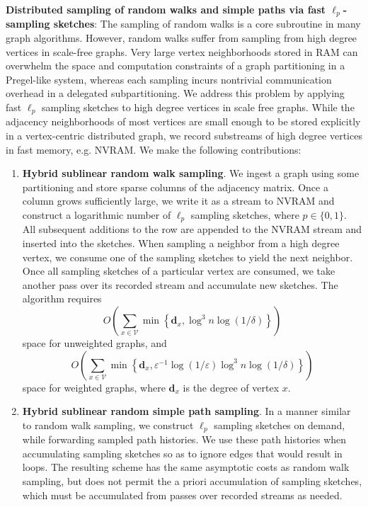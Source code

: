 \documentclass{report}
\begin{document}
\noindent
\textbf{Distributed sampling of random walks and simple paths via fast $\ell_p$-sampling sketches}:
The sampling of random walks is a core subroutine in many graph algorithms.
However, random walks suffer from sampling from high degree vertices in scale-free graphs. 
Very large vertex neighborhoods stored in RAM can overwhelm the space and computation constraints of a graph partitioning in a Pregel-like system, whereas each sampling incurs nontrivial communication overhead in a delegated subpartitioning. 
We address this problem by applying fast $\ell_p$ sampling sketches to high degree vertices in scale free graphs. 
While the adjacency neighborhoods of most vertices are small enough to be stored explicitly in a vertex-centric distributed graph, we record substreams of high degree vertices in fast memory, e.g. NVRAM. 
We make the following contributions:
%
\begin{enumerate}
	\item \textbf{Hybrid sublinear random walk sampling}. 
	We ingest a graph using some partitioning and store sparse columns of the adjacency matrix. 
	Once a column grows sufficiently large, we write it as a stream to NVRAM and construct a logarithmic number of $\ell_p$ sampling sketches, where $p \in \{0,1\}$. 
	All subsequent additions to the row are appended to the NVRAM stream and inserted into the sketches. 
	When sampling a neighbor from a high degree vertex, we consume one of the sampling sketches to yield the next neighbor.
	Once all sampling sketches of a particular vertex are consumed, we take another pass over its recorded stream and accumulate new sketches.
	The algorithm requires
	\begin{equation*}
	O\left ( \sum_{x \in \mathcal{V}} \min \left \{ \mathbf{d}_x, \log^3 n \log (1/\delta) \right \} \right )
	\end{equation*}
	space for unweighted graphs, and 
	\begin{equation*}
	O \left ( \sum_{x \in \mathcal{V}} \min \left \{ \mathbf{d}_x, \varepsilon^{-1} \log (1 / \varepsilon) \log^3 n \log (1/\delta) \right \} \right )
	\end{equation*}
	space for weighted graphs, where $\mathbf{d}_x$ is the degree of vertex $x$.
	\item \textbf{Hybrid sublinear random simple path sampling}.
	In a manner similar to random walk sampling, we construct $\ell_p$ sampling sketches on demand, while forwarding sampled path histories.
	We use these path histories when accumulating sampling sketches so as to ignore edges that would result in loops.
	The resulting scheme has the same asymptotic costs as random walk sampling, but does not permit the a priori accumulation of sampling sketches, which must be accumulated from passes over recorded streams as needed. 
\end{enumerate}
\end{document}
